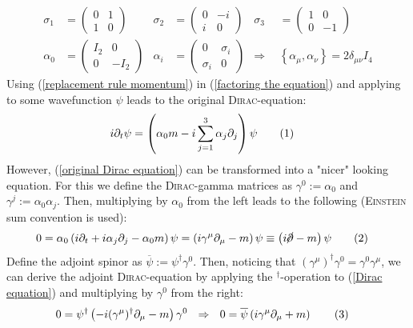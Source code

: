 \documentclass[a4paper,12pt]{article}
\newcommand\numberthis{\addtocounter{equation}{1}\tag{\theequation}}
\newcommand{\kla}{}
\newcommand{\klammer}{}
\begin{document}
\begin{align*}
\sigma_1&=\begin{pmatrix}
0 & 1 \\ 1 & 0
\end{pmatrix}&\sigma_2&=\begin{pmatrix}
0 & -i \\ i & 0
\end{pmatrix}&\sigma_3&=\begin{pmatrix}
1 & 0 \\ 0 & -1
\end{pmatrix} \\
\alpha_0&=\begin{pmatrix}
I_2 & 0 \\ 0 & -I_2
\end{pmatrix}&\alpha_i&=\begin{pmatrix}
0 & \sigma_i \\ \sigma_i & 0
\end{pmatrix}&\Rightarrow\ \ &\klammer\left\{{\alpha_\mu,\alpha_\nu} \right\}=2\delta_{\mu\nu}I_4
\end{align*}
Using (\ref{replacement rule momentum}) in (\ref{factoring the equation}) and applying to some wavefunction $\psi$ leads to the original \textsc{Dirac}-equation:
\begin{align*}
i\partial_t\psi&=\kla\left( {\alpha_0m-i\sum_{j=1}^3\alpha_j\partial_j} \right)\psi\numberthis\label{original Dirac equation}
\end{align*}
However, (\ref{original Dirac equation}) can be transformed into a "nicer" looking equation. For this we define the \textsc{Dirac}-gamma matrices as $\gamma^0:=\alpha_0$ and $\gamma^j:=\alpha_0\alpha_j$. Then, multiplying by $\alpha_0$ from the left leads to the following (\textsc{Einstein} sum convention is used):
\begin{align*}
0&=\alpha_0\kla\left( {i\partial_t+i\alpha_j\partial_j-\alpha_0m} \right)\psi=\kla\left( {i\gamma^\mu\partial_\mu-m} \right)\psi\equiv\kla\left( {i\cancel{\partial} -m} \right)\psi\numberthis\label{Dirac equation}
\end{align*}
Define the adjoint spinor as $\overline{\psi}:=\psi^\dagger\gamma^0$. Then, noticing that $(\gamma^\mu)^\dagger\gamma^0=\gamma^0\gamma^\mu$, we can derive the adjoint \textsc{Dirac}-equation by applying the ${}^\dagger$-operation to (\ref{Dirac equation}) and multiplying by $\gamma^0$ from the right:
\begin{align*}
0&=\psi^\dagger\kla\left( {-i(\gamma^\mu)^\dagger\partial_\mu -m} \right)\gamma^0\ \ \Rightarrow\ \ 0=\overline{\psi}\kla\left( {i\gamma^\mu\partial_\mu +m} \right)\numberthis\label{adjoint Dirac equation}
\end{align*}
\end{document}
